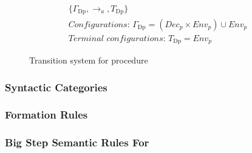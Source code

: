 \begin{figure}[htbp]
	\begin{gather*} 
		\{ \Gamma_\text{Dp}, \rightarrow_a, T_\text{Dp} \} \\ 
		\textit{Configurations: } \Gamma_\text{Dp} = (Dec_p \times Env_p) \cup Env_p \\ 
		\textit{Terminal configurations: } T_\text{Dp} = Env_p
	\end{gather*} 
	\caption{Transition system for procedure}
	\label{fig:TSDecp}
\end{figure}

\subsubsection*{Syntactic Categories}
\subsubsection*{Formation Rules}
\subsubsection*{Big Step Semantic Rules For \dazel{}}